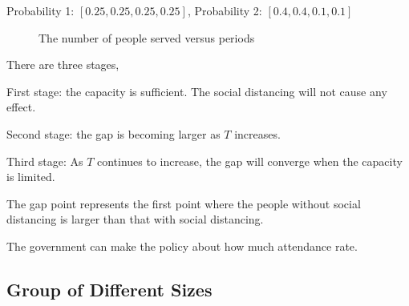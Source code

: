 Probability 1: $[0.25, 0.25, 0.25, 0.25]$,
Probability 2: $[0.4, 0.4, 0.1, 0.1]$

\begin{figure}[h]
  \centering
  \caption{The number of people served versus periods}
  \label{Fig.lable}
\end{figure}

There are three stages, 

First stage: the capacity is sufficient. The social distancing will not cause any effect.

Second stage: the gap is becoming larger as $T$ increases. 

Third stage: As $T$ continues to increase, the gap will converge when the capacity is limited.

The gap point represents the first point where the people without social distancing is larger than that with social distancing. 

The government can make the policy about how much attendance rate.

\subsection{Group of Different Sizes}


